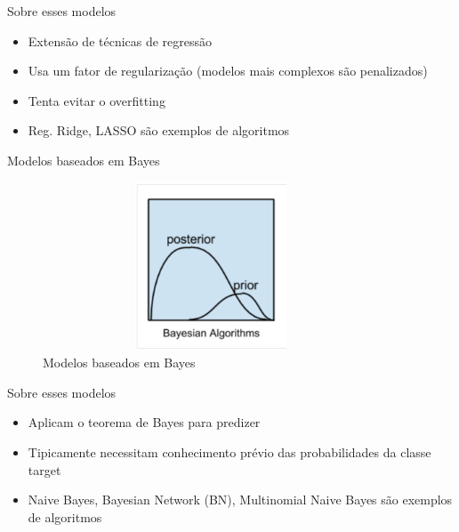\begin{frame}	
	\begin{block}{Sobre esses modelos}	
		\begin{itemize}
			\item Extensão de técnicas de regressão
			\item Usa um fator de regularização (modelos mais complexos são penalizados)
			\item Tenta evitar o overfitting
			\item Reg. Ridge, LASSO são exemplos de algoritmos 
		\end{itemize}
	\end{block}
\end{frame}

\begin{frame}	
	\begin{block}{Modelos baseados em Bayes}	
		\begin{figure}[!htb]
			\centering	  				
			\includegraphics[height=5cm, width = 10cm]{./pic/bayes.png}
			\caption{Modelos baseados em Bayes}
			\label{fig_modelos}
		\end{figure}
	\end{block}
\end{frame}


\begin{frame}	
	\begin{block}{Sobre esses modelos}	
		\begin{itemize}
			\item Aplicam o teorema de Bayes para predizer
			\item Tipicamente necessitam conhecimento prévio das probabilidades da classe target
			\item Naive Bayes, Bayesian Network (BN), Multinomial Naive Bayes  são exemplos de algoritmos 
		\end{itemize}
	\end{block}
\end{frame}


